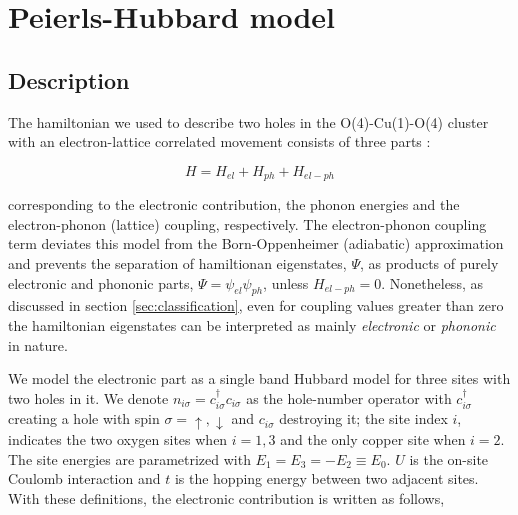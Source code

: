 \chapter{Peierls-Hubbard model}
\label{chap:model}



\section{Description}

The hamiltonian we used to describe two holes in the O(4)-Cu(1)-O(4) cluster with an electron-lattice correlated movement consists of three parts \cite{Salkola1994}:

\begin{equation}\label{eq:full-hamiltonian}
H = H_{el} + H_{ph} + H_{el-ph}
\end{equation}

\noindent corresponding to the electronic contribution, the phonon energies and the electron-phonon (lattice) coupling, respectively. 
The electron-phonon coupling term deviates this model from the Born-Oppenheimer (adiabatic) approximation and prevents the separation of hamiltionan eigenstates, $\Psi$, as products of purely electronic and phononic parts, $\Psi=\psi_{el}\psi_{ph}$, unless $H_{el-ph}=0$.
Nonetheless, as discussed in section \ref{sec:classification}, even for coupling values greater than zero the hamiltonian eigenstates can be interpreted as mainly \textit{electronic} or \textit{phononic} in nature.

We model the electronic part as a single band Hubbard model for three sites with two holes in it. 
We denote $n_{i\sigma}=c_{i\sigma}^\dagger c_{i\sigma}$ as the hole-number operator with $c_{i\sigma}^\dagger$ creating a hole with spin $\sigma = \uparrow, \downarrow$ and $c_{i\sigma}$ destroying it; the site index $i$, indicates the two oxygen sites when  $i=1,3$ and the only copper site when $i=2$. 
The site energies are parametrized with $E_1=E_3=-E_2 \equiv E_0$. 
$U$ is the on-site Coulomb interaction and $t$ is the hopping energy between two adjacent sites. 
With these definitions, the electronic contribution is written as follows,

